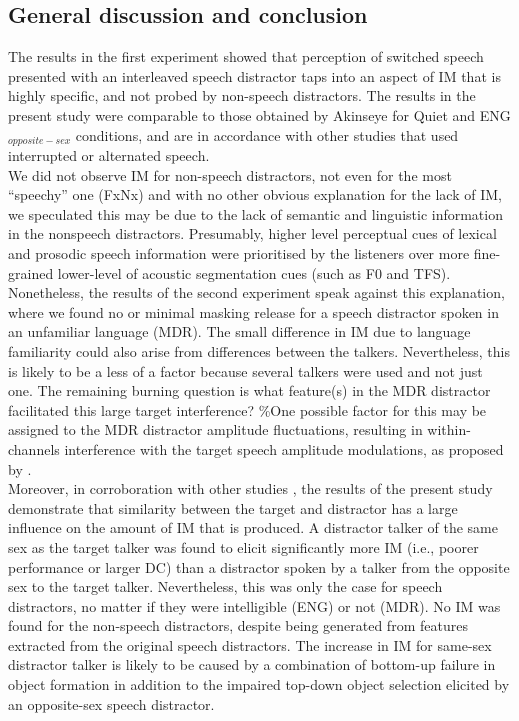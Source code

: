 \documentclass[a4paper, twoside]{templates/ociamthesis}
\begin{document}
\hypertarget{general-discussion-and-conclusion}{%
\subsection{General discussion and conclusion}\label{general-discussion-and-conclusion}}

The results in the first experiment showed that perception of switched speech presented with an interleaved speech distractor taps into an aspect of IM that is highly specific, and not probed by non-speech distractors. The results in the present study were comparable to those obtained by Akinseye \autocite*[unpublished BSc thesis,][]{Akinseye2015} for Quiet and ENG\(_{opposite-sex}\) conditions, and are in accordance with other studies that used interrupted or alternated speech.\\

We did not observe IM for non-speech distractors, not even for the most ``speechy'' one (FxNx) and with no other obvious explanation for the lack of IM, we speculated this may be due to the lack of semantic and linguistic information in the nonspeech distractors. Presumably, higher level perceptual cues of lexical and prosodic speech information were prioritised by the listeners over more fine-grained lower-level of acoustic segmentation cues (such as F0 and TFS).
Nonetheless, the results of the second experiment speak against this explanation, where we found no or minimal masking release for a speech distractor spoken in an unfamiliar language (MDR). The small difference in IM due to language familiarity could also arise from differences between the talkers. Nevertheless, this is likely to be a less of a factor because several talkers were used and not just one. The remaining burning question is what feature(s) in the MDR distractor facilitated this large target interference? \%One possible factor for this may be assigned to the MDR distractor amplitude fluctuations, resulting in within-channels interference with the target speech amplitude modulations, as proposed by \textcite{Stone2012}.\\

Moreover, in corroboration with other studies \autocites[e.g.,][]{Brungart2001,Festen1990}, the results of the present study demonstrate that similarity between the target and distractor has a large influence on the amount of IM that is produced. A distractor talker of the same sex as the target talker was found to elicit significantly more IM (i.e., poorer performance or larger DC) than a distractor spoken by a talker from the opposite sex to the target talker. Nevertheless, this was only the case for speech distractors, no matter if they were intelligible (ENG) or not (MDR). No IM was found for the non-speech distractors, despite being generated from features extracted from the original speech distractors. The increase in IM for same-sex distractor talker is likely to be caused by a combination of bottom-up failure in object formation in addition to the impaired top-down object selection elicited by an opposite-sex speech distractor.\\
\end{document}
